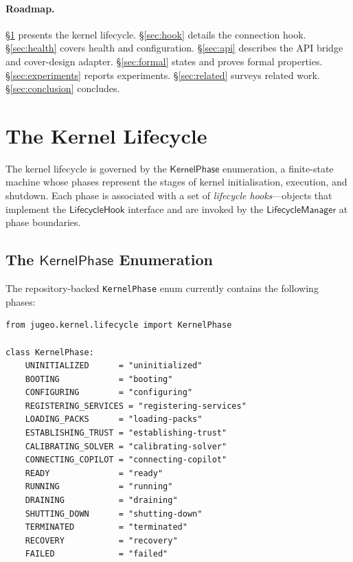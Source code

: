 \documentclass[11pt]{article}
\newcommand{\KP}{\mathsf{KernelPhase}}
\newcommand{\LM}{\mathsf{LifecycleManager}}
\newcommand{\LH}{\mathsf{LifecycleHook}}
\begin{document}
\paragraph{Roadmap.}
\S\ref{sec:lifecycle} presents the kernel lifecycle.
\S\ref{sec:hook} details the connection hook.
\S\ref{sec:health} covers health and configuration.
\S\ref{sec:api} describes the API bridge and cover-design adapter.
\S\ref{sec:formal} states and proves formal properties.
\S\ref{sec:experiments} reports experiments.
\S\ref{sec:related} surveys related work.
\S\ref{sec:conclusion} concludes.

\section{The \JuGeo{} Kernel Lifecycle}\label{sec:lifecycle}

The kernel lifecycle is governed by the $\KP$ enumeration,
a finite-state machine whose phases represent the stages of kernel
initialisation, execution, and shutdown.  Each phase is associated
with a set of \emph{lifecycle hooks}—objects that implement the
$\LH$ interface and are invoked by the $\LM$ at
phase boundaries.

\subsection{The \texorpdfstring{$\KP$}{KernelPhase} Enumeration}
\label{sec:kp-enum}

The repository-backed \texttt{KernelPhase} enum currently contains the
following phases:

\begin{lstlisting}[style=jugeo-python, caption={The $\KP$
  enumeration as exposed by the repository.}]
from jugeo.kernel.lifecycle import KernelPhase

class KernelPhase:
    UNINITIALIZED      = "uninitialized"
    BOOTING            = "booting"
    CONFIGURING        = "configuring"
    REGISTERING_SERVICES = "registering-services"
    LOADING_PACKS      = "loading-packs"
    ESTABLISHING_TRUST = "establishing-trust"
    CALIBRATING_SOLVER = "calibrating-solver"
    CONNECTING_COPILOT = "connecting-copilot"
    READY              = "ready"
    RUNNING            = "running"
    DRAINING           = "draining"
    SHUTTING_DOWN      = "shutting-down"
    TERMINATED         = "terminated"
    RECOVERY           = "recovery"
    FAILED             = "failed"
\end{lstlisting}
\end{document}
